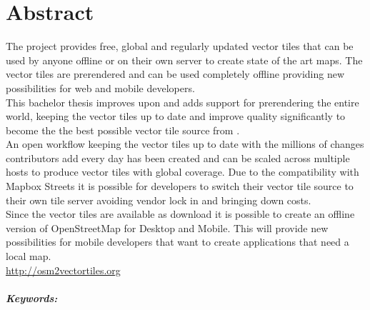 

\begingroup
\let\clearpage\relax
\let\cleardoublepage\relax
\let\cleardoublepage\relax

\chapter*{Abstract} %

The \osmvt{} project provides free, global and regularly updated vector tiles that can be used by anyone offline or on their own server to create
state of the art maps. The vector tiles are prerendered and can be used completely offline providing new possibilities for web and mobile developers. \\

This bachelor thesis improves upon \osmvt{} and adds support for prerendering the entire world, keeping the vector tiles up to date and improve quality significantly to become the the best possible vector tile source from \osm{}. \\  

An open workflow keeping the vector tiles up to date with the millions of changes \osm{} contributors add every day has been created and can be scaled across multiple hosts to produce vector tiles with global coverage.
Due to the compatibility with Mapbox Streets it is possible for developers to switch their vector tile source
to their own tile server avoiding vendor lock in and bringing down costs. \\

Since the  vector tiles are available as download it is possible to create an offline version of OpenStreetMap for Desktop and Mobile. This will provide new possibilities for mobile developers that want to create applications that need a local map. \\

\url{http://osm2vectortiles.org}

\endgroup			

\paragraph{Keywords:}\mbox{}\\
\textit{\myKeywords}

\vfill
